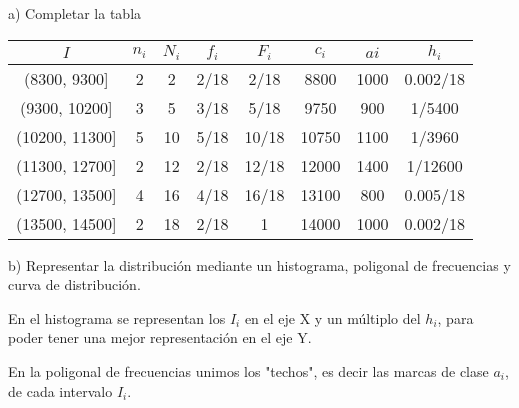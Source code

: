 a) Completar la tabla
\begin{center}
	\begin{table}[htbp]
		\begin{center}
			\begin{tabular}{|c|c|c|c|c|c|c|c|}
				\hline
				$I$ & $n_{i}$ & $N_{i}$ & $f_{i}$ & $F_{i}$ & $c_{i}$ & $a{i}$ & $h_{i}$\\\hline
				(8300, 9300] & 2 & 2 & 2/18 & 2/18 & 8800 & 1000 & 0.002/18 \\ \hline
				(9300, 10200] & 3 & 5 & 3/18 & 5/18 & 9750 & 900 & 1/5400 \\ \hline
				(10200, 11300] & 5 & 10 & 5/18 & 10/18 & 10750 & 1100 & 1/3960 \\ \hline
				(11300, 12700] & 2 & 12 & 2/18 & 12/18 & 12000 & 1400 & 1/12600 \\ \hline
				(12700, 13500] & 4 & 16 & 4/18 & 16/18 & 13100 & 800 & 0.005/18 \\ \hline
				(13500, 14500] & 2 & 18 & 2/18 & 1 & 14000 & 1000 & 0.002/18\\ \hline
			\end{tabular}
		\end{center}
	\end{table}
\end{center}

b) Representar la distribución mediante un histograma, poligonal de frecuencias y curva de
distribución.

\begin{center}
En el histograma se representan los $I_{i}$ en el eje X y un múltiplo del $h_{i}$, para poder tener una mejor representación en el eje Y. 
\end{center}

\begin{center}
\end{center}

\begin{center}
En la poligonal de frecuencias unimos los "techos", es decir las marcas de clase $a_{i}$, de cada intervalo $I_{i}$.
\end{center}

